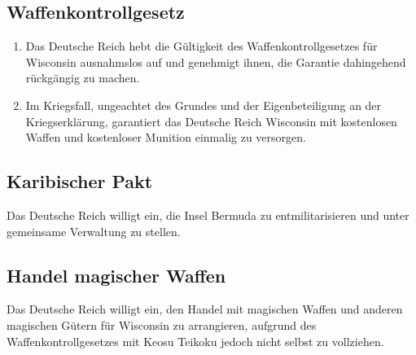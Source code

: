 \documentclass{article}
\begin{document}
\subsection{Waffenkontrollgesetz}
\begin{enumerate}[(1)]
    \item Das Deutsche Reich hebt die Gültigkeit des Waffenkontrollgesetzes für Wisconsin ausnahmslos auf und genehmigt ihnen, die Garantie dahingehend rückgängig zu machen.
    \item Im Kriegsfall, ungeachtet des Grundes und der Eigenbeteiligung an der Kriegserklärung, garantiert das Deutsche Reich Wisconsin mit kostenlosen Waffen und kostenloser Munition einmalig zu versorgen.
\end{enumerate}

\subsection{Karibischer Pakt}
Das Deutsche Reich willigt ein, die Insel Bermuda zu entmilitarisieren und unter gemeinsame Verwaltung zu stellen.

\subsection{Handel magischer Waffen}
Das Deutsche Reich willigt ein, den Handel mit magischen Waffen und anderen magischen Gütern für Wisconsin zu arrangieren, aufgrund des Waffenkontrollgesetzes mit Keosu Teikoku jedoch nicht selbst zu vollziehen.
\end{document}
